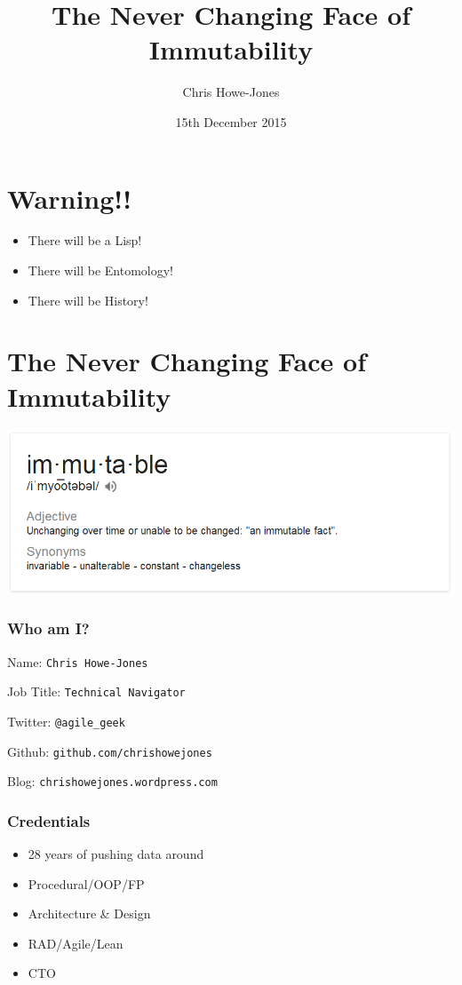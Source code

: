 \documentclass[11pt]{article}
\author{Chris Howe-Jones}
\date{15th December 2015}
\title{The Never Changing Face of Immutability}
\begin{document}
\maketitle

\section*{Warning!!}
\label{sec:orgheadline1}

\begin{itemize}
\item There will be a Lisp!
\item There will be Entomology!
\item There will be History!
\end{itemize}


\section*{The Never Changing Face of Immutability}
\label{sec:orgheadline29}

\includegraphics[width=.9\linewidth]{./immutable-defined.png}

\subsubsection*{Who am I?}
\label{sec:orgheadline2}

Name:      \texttt{Chris Howe-Jones}

Job Title: \texttt{Technical Navigator}

Twitter:   \texttt{@agile\_geek}

Github:    \texttt{github.com/chrishowejones}

Blog:      \texttt{chrishowejones.wordpress.com}

\subsubsection*{Credentials}
\label{sec:orgheadline3}

\begin{itemize}
\item 28 years of pushing data around
\item Procedural/OOP/FP
\item Architecture \& Design
\item RAD/Agile/Lean
\item CTO
\end{itemize}
\end{document}
